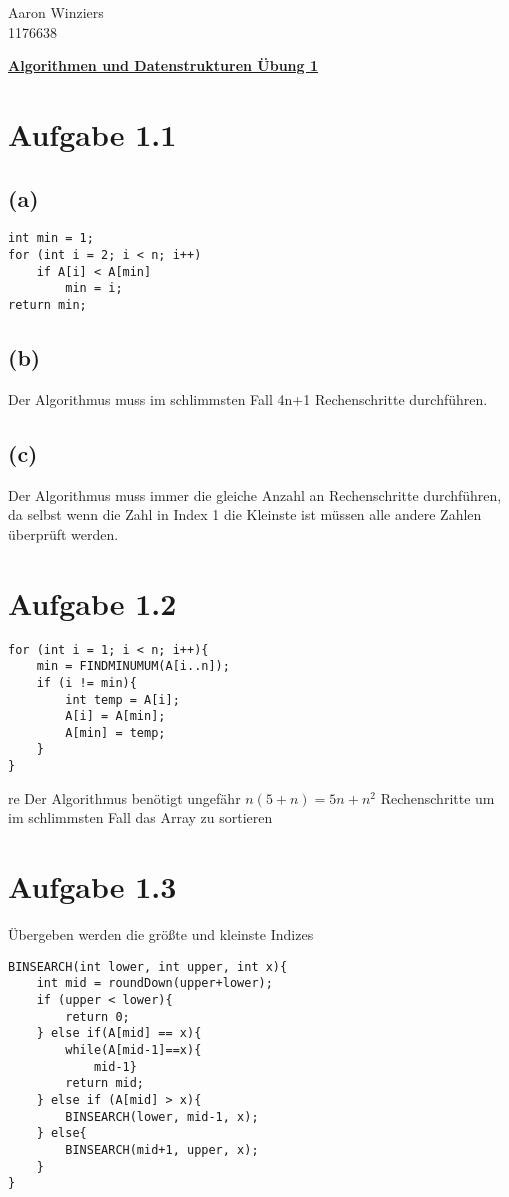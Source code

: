 \documentclass[10pt,a4paper]{article}
\author{Aaron Winziers}
\begin{document}
	\begin{flushright}
		Aaron Winziers	\\
		1176638
	\end{flushright}
	\begin{center}
		\underline{\textbf{Algorithmen und Datenstrukturen Übung 1}}
	\end{center}
	\section{Aufgabe 1.1}
	\subsection{(a)}
	\begin{lstlisting}
int min = 1;
for (int i = 2; i < n; i++)
	if A[i] < A[min]
		min = i;
return min;		
	\end{lstlisting}
	
	\subsection{(b)} Der Algorithmus muss im schlimmsten Fall 4n+1 Rechenschritte durchführen.
	
	\subsection{(c)} Der Algorithmus muss immer die gleiche Anzahl an Rechenschritte durchführen, da selbst wenn die Zahl in Index 1 die Kleinste ist müssen alle andere Zahlen überprüft werden.
	
	\section{Aufgabe 1.2}
	\begin{lstlisting}
for (int i = 1; i < n; i++){
	min = FINDMINUMUM(A[i..n]);
	if (i != min){
		int temp = A[i];
		A[i] = A[min];
		A[min] = temp;
	}
}	
	\end{lstlisting}
	re
	Der Algorithmus benötigt ungefähr $n(5+n) = 5n+n^{2}$ Rechenschritte um im schlimmsten Fall das Array zu sortieren
	
	\section{Aufgabe 1.3}
	Übergeben werden die größte und kleinste Indizes
	\begin{lstlisting}
BINSEARCH(int lower, int upper, int x){
	int mid = roundDown(upper+lower);
	if (upper < lower){
		return 0;
	} else if(A[mid] == x){
		while(A[mid-1]==x){
			mid-1}
		return mid;
	} else if (A[mid] > x){
		BINSEARCH(lower, mid-1, x);
	} else{
		BINSEARCH(mid+1, upper, x);
	}
}
	\end{lstlisting}
	
\end{document}
